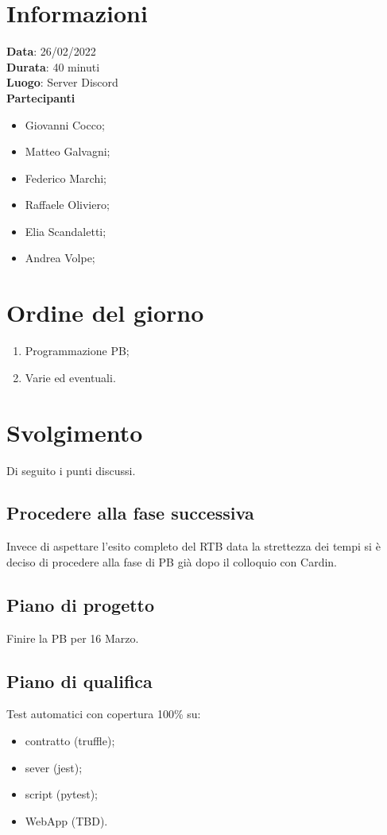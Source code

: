 \documentclass[a4paper, 12pt]{article}
\begin{document}
\makefrontpage

\section{Informazioni}
\textbf{Data}: 26/02/2022\\
\textbf{Durata}: 40 minuti\\
\textbf{Luogo}: Server Discord\\

\textbf{Partecipanti}
\begin{itemize}
	\item Giovanni Cocco;
	\item Matteo Galvagni;
	\item Federico Marchi;
	\item Raffaele Oliviero;
	\item Elia Scandaletti;
	\item Andrea Volpe;
\end{itemize}

\section{Ordine del giorno}
\begin{enumerate}
	\item Programmazione PB;
	\item Varie ed eventuali.

\end{enumerate}

\section{Svolgimento}
Di seguito i punti discussi.
\subsection{Procedere alla fase successiva}
Invece di aspettare l'esito completo del RTB data la strettezza dei tempi si è deciso di procedere alla fase di PB già dopo il colloquio con Cardin.

\subsection{Piano di progetto}
Finire la PB per 16 Marzo.

\subsection{Piano di qualifica}
Test automatici con copertura 100\% su:
\begin{itemize}
	\item contratto (truffle);
	\item sever (jest);
	\item script (pytest);
	\item WebApp (TBD).
\end{itemize}
\end{document}
